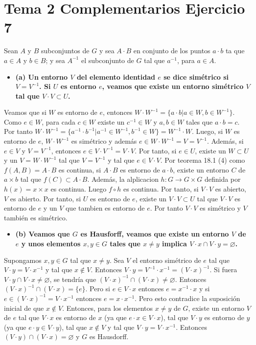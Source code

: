 \documentclass{article}
\begin{document}
\section{Tema 2 Complementarios Ejercicio 7}
Sean $A$ y $B$ subconjuntos de $G$ y sea $A\cdot B$ en conjunto de los puntos $a\cdot b$ ta que $a\in A$ y $b\in B$; y sea $A^{-1}$ el subconjunto de $G$ tal que $a^{-1}$, para $a\in A$.
\begin{itemize}
\item \bf (a) \rm Un entorno $V$ del elemento identidad $e$ se dice simétrico si $V=V^{-1}$. Si $U$ es entorno $e$, veamos que existe un entorno simétrico $V$ tal que $V\cdot V\subset U$.
\end{itemize}
Veamos que si $W$ es entorno de $e$, entonces $W\cdot W^{-1}=\{a\cdot b|a\in W, b\in W^{-1}\}$. Como $e\in W$, para cada $c\in W$ existe un $c^{-1}\in W$ y $a,b\in W$ tales que $a\cdot b=c$. Por tanto $W\cdot W^{-1}=\{a^{-1}\cdot b^{-1}|a^{-1}\in W^{-1}, b^{-1}\in W\}=W^{-1}\cdot W$. Luego, si $W$ es entorno de $e$, $W\cdot W^{-1}$ es simétrico y además $e\in W\cdot W^{-1}=V=V^{-1}$. Además, si $e\in V$ y $V=V^{-1}$, entonces $e\in V\cdot V^{-1}=V\cdot V$. Por tanto, si $e\in U$, existe un $W\subset U$ y un $V=W\cdot W^{-1}$ tal que $V=V^{-1}$ y tal que $e\in V\cdot V$. Por teorema 18.1 (4) como $f(A,B)=A\cdot B$ es continua, si $A\cdot B$ es entorno de $a\cdot b$, existe un entorno $C$ de $a\times b$ tal que $f(C)\subset A\cdot B$. Además, la alplicacion $h:G\rightarrow G\times G$ definida por $h(x)= x\times x$ es continua. Luego $f\circ h$ es continua. Por tanto, si $V\cdot V$ es abierto, $V$ es abierto. Por tanto, si $U$ es entorno de $e$, existe un $V\cdot V\subset U$ tal que $V\cdot V$ es entorno de $e$ y un $V$ que tambien es entorno de $e$. Por tanto $V\cdot V$ es simétrico y $V$ también es simétrico. 
\begin{itemize}
\item \bf (b) \rm Veamos que $G$ es Hausforff, veamos que existe un entorno $V$ de $e$ y unos elementos $x,y\in G$ tales que $x\neq y$ implica $V\cdot x\cap V\cdot y=\varnothing $.
\end{itemize}
Supongamos $x,y\in G$ tal que $x\neq y$. Sea $V$ el entorno simétrico de $e$ tal que $V\cdot y=V\cdot x^{-1}$ y tal que $x\notin V$. Entonces $V\cdot y=V^{-1}\cdot x^{-1}=(V\cdot x)^{-1}$. Si fuera $V\cdot y\cap V\cdot x\neq \varnothing$, se tendría que $(V\cdot x)^{-1}\cap (V\cdot x)\neq \varnothing$. Entonces $ (V\cdot x)^{-1}\cap (V\cdot x)= \{e\}$. Pero si $e\in V\cdot x$ entonces $e=x^{-1}\cdot x $ y si $e\in (V\cdot x)^{-1}= V\cdot x^{-1}$ entonces $e=x\cdot x^{-1}$. Pero esto contradice la suposición inicial de que $x\notin V$. Entonces, para los elementos $x\neq y$ de $G$, existe un entorno $V$ de $e$ tal que $V\cdot x$ es entorno de $x$ (ya que $e\cdot x\in V\cdot x$), tal que $V\cdot y$ es entorno de $y$ (ya que $e\cdot y\in V\cdot y$),  tal que $x\notin V$ y tal que $V\cdot y = V\cdot x^{-1}$. Entonces $(V\cdot y)\cap (V\cdot x)=\varnothing$ y $G$ es Hausdorff.
\end{document}
